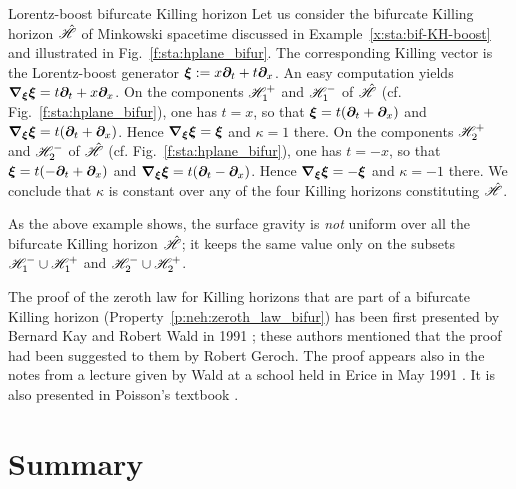 \begin{texample}{Lorentz-boost bifurcate Killing horizon}{}
Let us consider the bifurcate Killing horizon $\hat{\mathscr{H}}$
of Minkowski spacetime discussed in Example~\ref{x:sta:bif-KH-boost} and illustrated
in Fig.~\ref{f:sta:hplane_bifur}. The corresponding Killing vector is
the Lorentz-boost generator $\bm{\xi} := x \bm{\partial}_t + t \bm{\partial}_x$. An easy computation
yields $\bm{\nabla}_{\bm{\xi}} \bm{\xi} = t \bm{\partial}_t + x \bm{\partial}_x$. On the components
$\mathscr{H}_1^+$ and $\mathscr{H}_1^-$ of $\hat{\mathscr{H}}$ (cf. Fig.~\ref{f:sta:hplane_bifur}),
one has $t=x$, so that $\bm{\xi} =  t (\bm{\partial}_t + \bm{\partial}_x)$ and
$\bm{\nabla}_{\bm{\xi}} \bm{\xi} = t (\bm{\partial}_t + \bm{\partial}_x)$. Hence $\bm{\nabla}_{\bm{\xi}} \bm{\xi} = \bm{\xi}$
and $\kappa = 1$ there.
On the components $\mathscr{H}_2^+$ and $\mathscr{H}_2^-$ of $\hat{\mathscr{H}}$ (cf. Fig.~\ref{f:sta:hplane_bifur}),
one has $t=-x$, so that $\bm{\xi} =  t (-\bm{\partial}_t + \bm{\partial}_x)$
and
$\bm{\nabla}_{\bm{\xi}} \bm{\xi} = t (\bm{\partial}_t - \bm{\partial}_x)$.
Hence  $\bm{\nabla}_{\bm{\xi}} \bm{\xi} = - \bm{\xi}$ and $\kappa = -1$ there.
We conclude that $\kappa$ is constant over any of the four Killing horizons
constituting $\hat{\mathscr{H}}$.
\end{texample}

\begin{remark}
As the above example shows, the surface gravity is \emph{not} uniform over
all the bifurcate Killing horizon $\hat{\mathscr{H}}$; it keeps the same value only on the subsets $\mathscr{H}_1^-\cup \mathscr{H}_1^+$
and $\mathscr{H}_2^-\cup \mathscr{H}_2^+$.
\end{remark}


\begin{hist}
The proof of the zeroth law for Killing horizons that are part of a bifurcate Killing horizon (Property~\ref{p:neh:zeroth_law_bifur}) has been first presented by Bernard Kay
and Robert Wald in 1991 \cite{KayW91}; these authors mentioned that the proof had been suggested
to them by Robert Geroch. The proof appears also in the notes from a lecture
given by Wald at a school held in Erice in May 1991 \cite{Wald92}. It is also presented in
Poisson's textbook \cite{Poiss04}.
\end{hist}


\section{Summary}

